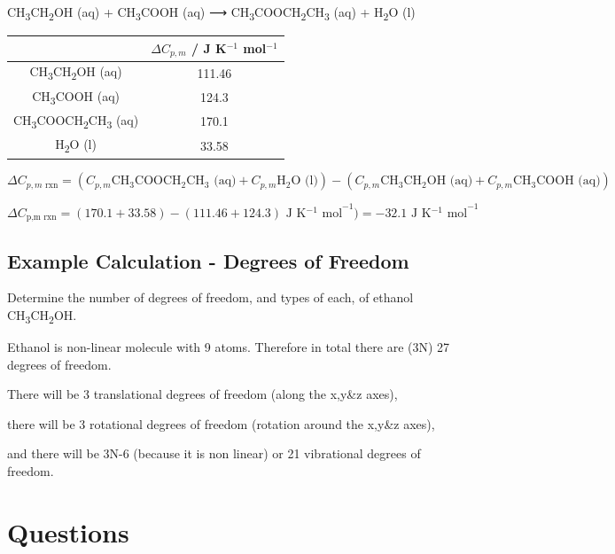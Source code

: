 \documentclass[
]{book}
\begin{document}
CH\textsubscript{3}CH\textsubscript{2}OH (aq) + CH\textsubscript{3}COOH (aq) ⟶ CH\textsubscript{3}COOCH\textsubscript{2}CH\textsubscript{3} (aq) + H\textsubscript{2}O (l)

\begin{longtable}[]{@{}cc@{}}
\toprule
& \(ΔC_{p,m}\) / J K\(^{−1}\) mol\(^{−1}\)\tabularnewline
\midrule
\endhead
CH\textsubscript{3}CH\textsubscript{2}OH (aq) & 111.46\tabularnewline
CH\textsubscript{3}COOH (aq) & 124.3\tabularnewline
CH\textsubscript{3}COOCH\textsubscript{2}CH\textsubscript{3} (aq) & 170.1\tabularnewline
H\textsubscript{2}O (l) & 33.58\tabularnewline
\bottomrule
\end{longtable}

\begin{equation*}
ΔC_{p,m \textrm{ rxn}} = (C_{p,m} \textrm{CH$_3$COOCH$_2$CH$_3$ (aq)} + C_{p,m} \textrm{H$_2$O (l)}) − (C_{p,m} \textrm{CH$_3$CH$_2$OH (aq)} + C_{p,m} \textrm{CH$_3$COOH (aq)})
\end{equation*}

\begin{equation*}
ΔC_\textrm{p,m rxn} = (170.1 + 33.58) − (111.46 + 124.3) \textrm{ J K$^{-1}$ mol}^{−1}) = − 32.1 \textrm{ J K$^{-1}$ mol}^{−1}
\end{equation*}

\hypertarget{subsec:exampledegreesoffreedom}{%
\subsection{Example Calculation - Degrees of Freedom}\label{subsec:exampledegreesoffreedom}}

Determine the number of degrees of freedom, and types of each, of ethanol CH\textsubscript{3}CH\textsubscript{2}OH.

Ethanol is non-linear molecule with 9 atoms. Therefore in total there are (3N) 27 degrees of freedom.

There will be 3 translational degrees of freedom (along the x,y\&z axes),

there will be 3 rotational degrees of freedom (rotation around the x,y\&z axes),

and there will be 3N-6 (because it is non linear) or 21 vibrational degrees of freedom.

\hypertarget{sec:Questions1}{%
\section{Questions}\label{sec:Questions1}}
\end{document}
